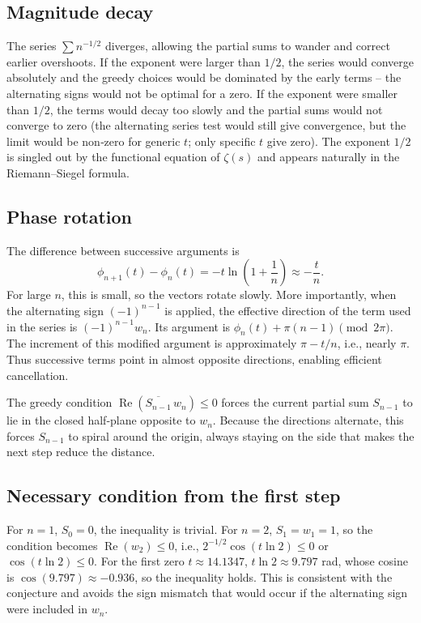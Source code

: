 \documentclass[12pt,a4paper]{article}
\begin{document}
\subsection{Magnitude decay}
The series $\sum n^{-1/2}$ diverges, allowing the partial sums to wander and correct earlier overshoots. If the exponent were larger than $1/2$, the series would converge absolutely and the greedy choices would be dominated by the early terms – the alternating signs would not be optimal for a zero. If the exponent were smaller than $1/2$, the terms would decay too slowly and the partial sums would not converge to zero (the alternating series test would still give convergence, but the limit would be non‑zero for generic $t$; only specific $t$ give zero). The exponent $1/2$ is singled out by the functional equation of $\zeta(s)$ and appears naturally in the Riemann–Siegel formula.

\subsection{Phase rotation}
The difference between successive arguments is
\[
\phi_{n+1}(t)-\phi_n(t)=-t\ln\!\left(1+\frac1n\right)\approx -\frac{t}{n}.
\]
For large $n$, this is small, so the vectors rotate slowly. More importantly, when the alternating sign $(-1)^{n-1}$ is applied, the effective direction of the term used in the series is $(-1)^{n-1}w_n$. Its argument is $\phi_n(t)+\pi(n-1)\pmod{2\pi}$. The increment of this modified argument is approximately $\pi - t/n$, i.e., nearly $\pi$. Thus successive terms point in almost opposite directions, enabling efficient cancellation.

The greedy condition $\operatorname{Re}(\overline{S_{n-1}}\,w_n)\le0$ forces the current partial sum $S_{n-1}$ to lie in the closed half‑plane opposite to $w_n$. Because the directions alternate, this forces $S_{n-1}$ to spiral around the origin, always staying on the side that makes the next step reduce the distance.

\subsection{Necessary condition from the first step}
For $n=1$, $S_0=0$, the inequality is trivial. For $n=2$, $S_1=w_1=1$, so the condition becomes $\operatorname{Re}(w_2)\le0$, i.e., $2^{-1/2}\cos(t\ln2)\le0$ or $\cos(t\ln2)\le0$. For the first zero $t\approx14.1347$, $t\ln2\approx9.797$ rad, whose cosine is $\cos(9.797)\approx-0.936$, so the inequality holds. This is consistent with the conjecture and avoids the sign mismatch that would occur if the alternating sign were included in $w_n$.
\end{document}
